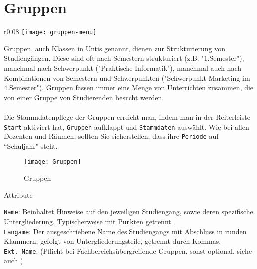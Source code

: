 \section{Gruppen}

\begin{wrapfigure}{r}{0.08\textwidth}
	\vspace{-70pt}
	\texttt{[image: gruppen-menu]}
\end{wrapfigure}

\vspace{25pt}

Gruppen, auch Klassen in Untis genannt, dienen zur Strukturierung von Studiengängen. Diese sind oft nach Semestern strukturiert (z.B. "1.Semester"), manchmal nach Schwerpunkt ("Praktische Informatik"), manchmal auch nach Kombinationen von Semestern und Schwerpunkten ("Schwerpunkt Marketing im 4.Semester"). Gruppen fassen immer eine Menge von Unterrichten zusammen, die von einer Gruppe von Studierenden besucht werden.\\
\\
Die Stammdatenpflege der Gruppen erreicht man, indem man in der Reiterleiste \texttt{Start} aktiviert hat, \texttt{Gruppen} aufklappt und \texttt{Stammdaten} auswählt. Wie bei allen Dozenten und Räumen, sollten Sie sicherstellen, dass ihre \texttt{Periode} auf ``Schuljahr" \hspace{1pt} steht.

\begin{figure}[h]
	\texttt{[image: Gruppen]}
	\vspace{-15pt}
	\caption{Gruppen}
	\label{fig:groups}
\end{figure}

\noindent
{\large Attribute\par}
\vspace{8pt}

\noindent
\texttt{Name}: Beinhaltet Hinweise auf den jeweiligen Studiengang, sowie deren spezifische Untergliederung. Typischerweise mit Punkten getrennt.\\

\noindent
\texttt{Langame}: Der ausgeschriebene Name des Studiengangs mit Abschluss in runden Klammern, gefolgt von Untergliederungsteile, getrennt durch Kommas.\\

\noindent
\texttt{Ext. Name}: (Pflicht bei Fachbereichsübergreifende Gruppen, sonst optional, siehe auch 
)\\

